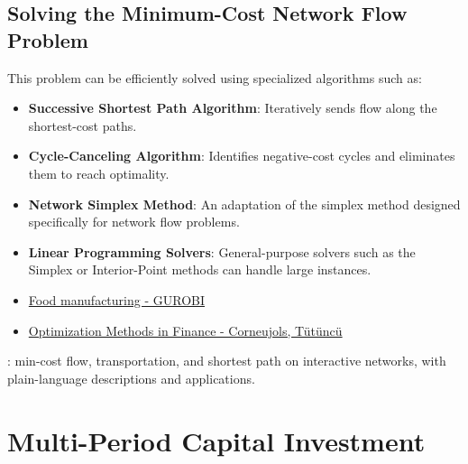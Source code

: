 \subsection*{Solving the Minimum-Cost Network Flow Problem}
This problem can be efficiently solved using specialized algorithms such as:
\begin{itemize}
\item \textbf{Successive Shortest Path Algorithm}: Iteratively sends flow along the shortest-cost paths.
\item \textbf{Cycle-Canceling Algorithm}: Identifies negative-cost cycles and eliminates them to reach optimality.
\item \textbf{Network Simplex Method}: An adaptation of the simplex method designed specifically for network flow problems.
\item \textbf{Linear Programming Solvers}: General-purpose solvers such as the Simplex or Interior-Point methods can handle large instances.
\end{itemize}

\begin{resource}
\begin{itemize}
\item \href{https://gurobi.github.io/modeling-examples/food_manufacturing_1_2/food_manufacture_1.html}{Food manufacturing - GUROBI}
\item \href{https://www.andrew.cmu.edu/user/gc0v/webpub/book.pdf}{Optimization Methods in Finance - Corneujols, T\"ut\"unc\"u}
\end{itemize}
\end{resource}

\begin{tryit}
: min-cost flow, transportation, and shortest path on interactive networks, with plain-language descriptions and applications.
\end{tryit}

%
%
\section{Multi-Period Capital Investment}
\label{sec:multi-period-capital-investment}

